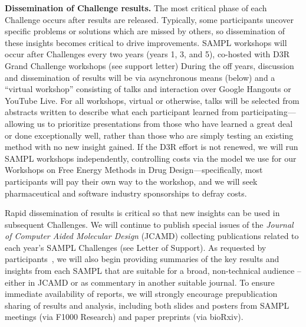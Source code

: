 \documentclass[11pt]{article}
\begin{document}
{\bf Dissemination of Challenge results.}
The most critical phase of each Challenge occurs after results are released. 
Typically, some participants uncover specific problems or solutions which are missed by others, so dissemination of these insights becomes critical to drive improvements.
SAMPL workshops will occur after Challenges every two years (years 1, 3, and 5), co-hosted with D3R Grand Challenge workshops (see support letter)
During the off years, discussion and dissemination of results will be via asynchronous means (below) and a ``virtual workshop'' consisting of talks and interaction over Google Hangouts or YouTube Live.
For all workshops, virtual or otherwise, talks will be selected from abstracts written to describe what each participant learned from participating---allowing us to prioritize presentations from those who have learned a great deal or done exceptionally well, rather than those who are simply testing an existing method with no new insight gained. 
If the D3R effort is not renewed, we will run SAMPL workshops independently, controlling costs via the model we use for our Workshops on Free Energy Methods in Drug Design---specifically, most participants will pay their own way to the workshop, and we will seek pharmaceutical and software industry sponsorships to defray costs. 

Rapid dissemination of results is critical so that new insights can be used in subsequent Challenges.
We will continue to publish special issues of the \emph{Journal of Computer Aided Molecular Design} (JCAMD) collecting publications related to each year's SAMPL Challenges (see Letter of Support).
As requested by participants~\cite{Mobley:2017:eScholarship}, we will also begin providing summaries of the key results and insights from each SAMPL that are suitable for a broad, non-technical audience -- either in JCAMD or as commentary in another suitable journal.
To ensure immediate availability of reports, we will strongly encourage prepublication sharing of results and analysis, including both slides and posters from SAMPL meetings (via F1000 Research) and paper preprints (via bioRxiv).
\end{document}
